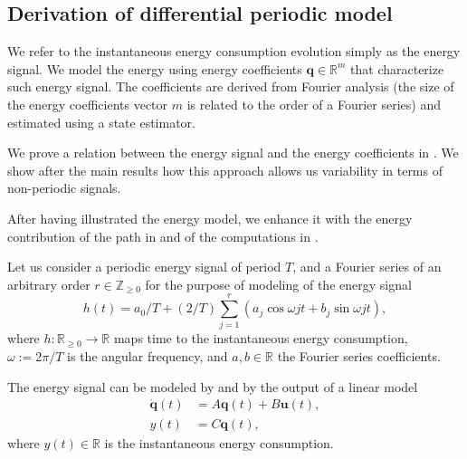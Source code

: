 \subsection{Derivation of differential periodic model}
\label{sec:periodic-model}

We refer to the instantaneous energy consumption evolution simply as the energy signal. We model the energy using energy coefficients $\mathbf{q}\in\mathbb{R}^m$ that characterize such energy signal. The coefficients are derived from Fourier analysis (the size of the energy coefficients vector $m$ is related to the order of a Fourier series) and estimated using a state estimator. 

We prove a relation between the energy signal and the energy coefficients in . We show after the main results how this approach allows us variability in terms of non-periodic signals.

After having illustrated the energy model, we enhance it with the energy contribution of the path in and of the computations in . 

Let us consider a periodic energy signal of period $T$, and a Fourier series of an arbitrary order $r\in\mathbb{Z}_{\geq 0}$ for the purpose of modeling of the energy signal
\begin{equation}\label{eq:fourier}
  h(t)=a_0/T+(2/T)\sum_{j=1}^{r}{\left(a_j\cos{\omega jt}+b_j\sin{\omega jt}\right)},
\end{equation}
where $h:\mathbb{R}_{\geq 0}\rightarrow\mathbb{R}$ maps time to the instantaneous energy consumption, $\omega:=2\pi/T$ is the angular frequency, and $a,b\in\mathbb{R}$ the Fourier series coefficients.

The energy signal can be modeled by  and by the output of a linear model
\begin{subequations}\label{eq:state-perf}\begin{align}
  \dot{\mathbf{q}}(t)&=A\mathbf{q}(t)+B\mathbf{u}(t),\\
  y(t)&=C\mathbf{q}(t),
\end{align}\end{subequations}
where $y(t)\in\mathbb{R}$ is the instantaneous energy consumption. 

